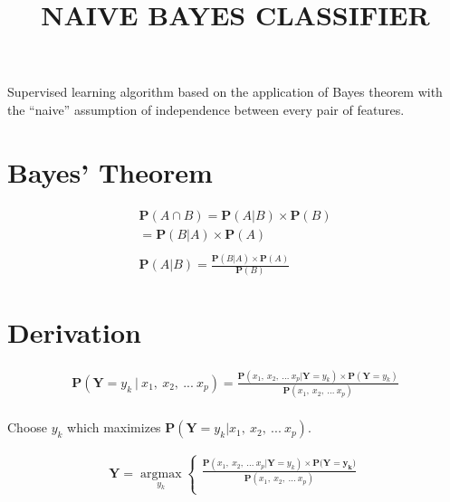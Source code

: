 \documentclass[11pt, a4paper]{article}
\begin{document}
\title{NAIVE BAYES CLASSIFIER}
\date{}
\maketitle

Supervised learning algorithm based on the application of Bayes\textsc{} theorem with the
``naive'' assumption of independence between every pair of features.

\section{Bayes' Theorem}

\begin{align*}
	\mathbf{P}(A\cap B) = \mathbf{P}(A|B) \times \mathbf{P}(B)                   \\
	= \mathbf{P}(B|A) \times \mathbf{P}(A)                                       \\
	                                                                             \\
	\mathbf{P}(A|B) = \frac{\mathbf{P}(B|A) \times \mathbf{P}(A)}{\mathbf{P}(B)}
\end{align*}

\section{Derivation}

\begin{align*}
	\mathbf{P}(\mathbf{Y}=y_k\ |\ x_1,\ x_2,\ ...\ x_p) = \frac{\mathbf{P}(x_1,\ x_2,\ ...\ x_p|\mathbf{Y}=y_k) \times \mathbf{P}(\mathbf{Y}=y_k)}{\mathbf{P}(x_1,\ x_2,\ ...\ x_p)} \\
\end{align*}

Choose $y_k$ which maximizes $\mathbf{P}(\mathbf{Y}=y_k | x_1,\ x_2,\ ...\ x_p)$.

\begin{align*}
	\mathbf{Y} = \operatorname*{argmax}_{y_k}\left\{
	\begin{array}{ll}
	\frac{\mathbf{P}(x_1,\ x_2,\ ...\ x_p | \mathbf{Y}=y_k) \times \mathbf{P}(\mathbf{Y=y_k)}}{\mathbf{P}(x_1,\ x_2,\ ...\ x_p)} \\
	\end{array}
	\right.                                                                                                                      \\
\end{align*}
\end{document}
